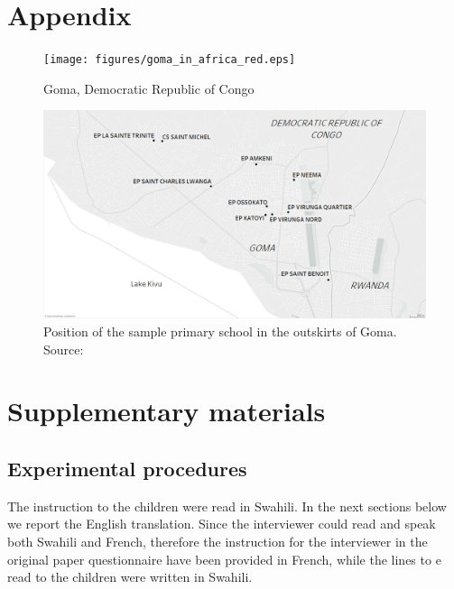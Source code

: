 \documentclass[authoryear, preprint, review, 12pt]{elsarticle}
\renewcommand{\thetable}{\arabic{table}}
\begin{document}
\processdelayedfloats

\clearpage
\normalsize
\section*{Appendix}
\processdelayedfloats
\renewcommand{\thefigure}{A\arabic{figure}}
\renewcommand{\thepostfigure}{A\arabic{postfigure}}
\setcounter{figure}{0}
\setcounter{postfigure}{0}
\renewcommand{\thetable}{A\arabic{table}}
\renewcommand{\theposttable}{A\arabic{posttable}}
\setcounter{table}{0}
\setcounter{posttable}{0}

\begin{figure}[!h]
\centering
\texttt{[image: figures/goma\_in\_africa\_red.eps]}
\caption{Goma, Democratic Republic of Congo}
\end{figure}

\begin{figure}[!h]
\centering
\includegraphics[width=0.7\linewidth]{figures/goma_map_RISS_bn.JPG}
\caption{Position of the sample primary school in the outskirts of Goma. Source: \cite{rossignoli2017growing}}
\end{figure}





\clearpage

\setcounter{section}{0}
\renewcommand{\thesection}{S\arabic{section}}
\section{Supplementary materials}
\subsection{Experimental procedures}
The instruction to the children were read in Swahili. In the next sections below we report the English translation. Since the interviewer could read and speak both Swahili and French, therefore the instruction for the interviewer in the original paper questionnaire have been provided in French, while the lines to e read to the children were written in Swahili.
\end{document}
